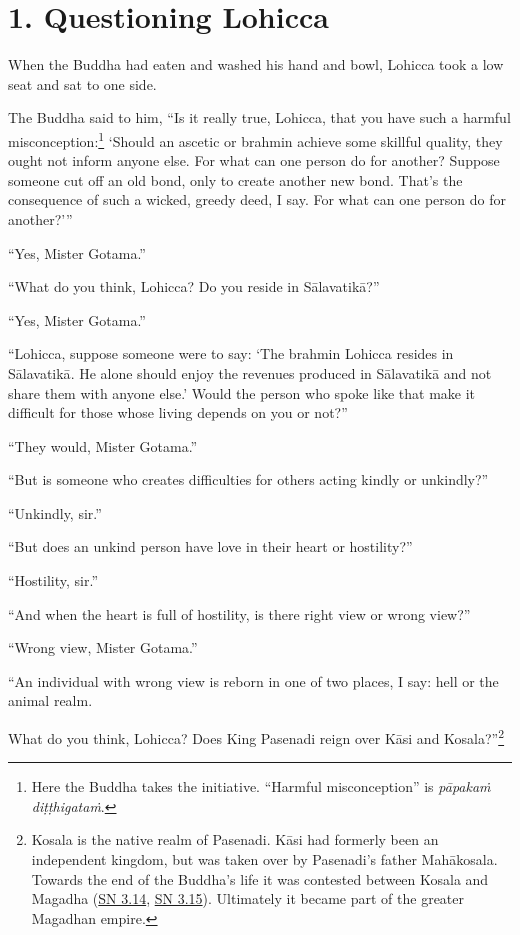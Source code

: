 \documentclass[12pt,openany]{book}%
\begin{document}
\section*{1. Questioning Lohicca }

When the Buddha had eaten and washed his hand and bowl, Lohicca took a low seat and sat to one side. 

The Buddha said to him, “Is it really true, Lohicca, that you have such a harmful misconception:\footnote{Here the Buddha takes the initiative. “Harmful misconception” is \textit{\textsanskrit{pāpakaṁ} \textsanskrit{diṭṭhigataṁ}}. } ‘Should an ascetic or brahmin achieve some skillful quality, they ought not inform anyone else. For what can one person do for another? Suppose someone cut off an old bond, only to create another new bond. That’s the consequence of such a wicked, greedy deed, I say. For what can one person do for another?’” 

“Yes, Mister Gotama.” 

“What do you think, Lohicca? Do you reside in \textsanskrit{Sālavatikā}?” 

“Yes, Mister Gotama.” 

“Lohicca, suppose someone were to say: ‘The brahmin Lohicca resides in \textsanskrit{Sālavatikā}. He alone should enjoy the revenues produced in \textsanskrit{Sālavatikā} and not share them with anyone else.’ Would the person who spoke like that make it difficult for those whose living depends on you or not?” 

“They would, Mister Gotama.” 

“But is someone who creates difficulties for others acting kindly or unkindly?” 

“Unkindly, sir.” 

“But does an unkind person have love in their heart or hostility?” 

“Hostility, sir.” 

“And when the heart is full of hostility, is there right view or wrong view?” 

“Wrong view, Mister Gotama.” 

“An individual with wrong view is reborn in one of two places, I say: hell or the animal realm. 

What do you think, Lohicca? Does King Pasenadi reign over \textsanskrit{Kāsi} and Kosala?”\footnote{Kosala is the native realm of Pasenadi. \textsanskrit{Kāsi} had formerly been an independent kingdom, but was taken over by Pasenadi’s father \textsanskrit{Mahākosala}. Towards the end of the Buddha’s life it was contested between Kosala and Magadha (\href{https://suttacentral.net/sn3.14/en/sujato}{SN 3.14}, \href{https://suttacentral.net/sn3.15/en/sujato}{SN 3.15}). Ultimately it became part of the greater Magadhan empire. } 
\end{document}
